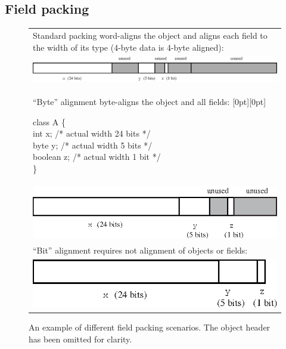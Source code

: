 \documentclass[preprint]{acmconf}
\begin{document}
\subsection{Field packing}
\label{sec:field-packing}

\begin{figure}
\centering
\begin{tabular}{|l|}
\hline
Standard packing word-aligns the object and aligns each field to the
width of its type (4-byte data is 4-byte aligned):\\
\includegraphics[scale=0.7]{Figures/standardAlignment.eps}\\
``Byte'' alignment byte-aligns the object and all fields:
\hfill\raisebox{-1ex}[0pt][0pt]{\parbox[t]{3in}{
\begin{samplecode}
class A \{\\
\>int x;  /* actual width 24 bits */\\
\>byte y; /* actual width 5 bits */\\
\>boolean z; /* actual width 1 bit */\\
\}\\
\end{samplecode}
}}\\
\includegraphics[scale=0.7]{Figures/byteAlignment.eps}\\
``Bit'' alignment requires not alignment of objects or fields:\\
\includegraphics[scale=0.7]{Figures/bitAlignment.eps}\\
\hline
\end{tabular}
\caption{An example of different field packing scenarios.  The object
  header has been omitted for clarity.}
\label{fig:packing}
\end{figure}
\end{document}
